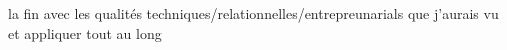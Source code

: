 \documentclass[a4paper, 11pt, french]{report}
\begin{document}
                                                                                                                                                                                      la
                                                                                                                                                                                      fin
                                                                                                                                                                                      avec
                                                                                                                                                                                      les
                                                                                                                                                                                      qualités
                                                                                                                                                                                      techniques/relationnelles/entrepreunarials
                                                                                                                                                                                      que
                                                                                                                                                                                      j'aurais
                                                                                                                                                                                      vu
                                                                                                                                                                                      et
                                                                                                                                                                                      appliquer
                                                                                                                                                                                      tout
                                                                                                                                                                                      au
                                                                                                                                                                                      long
\end{document}
